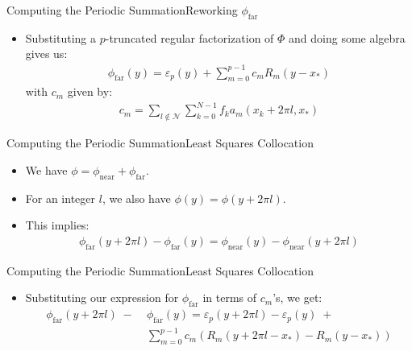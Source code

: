 \documentclass{beamer}
\newcommand{\parens}[1]{\left(#1\right)}
\newcommand{\phinear}{\phi_{\operatorname{near}}}
\newcommand{\phifar}{\phi_{\operatorname{far}}}
\begin{document}
\begin{frame}{Computing the Periodic Summation}{Reworking $\phifar$}
  \begin{itemize}
  \item Substituting a $p$-truncated regular factorization of $\Phi$
    and doing some algebra gives us:
    \begin{align*}
      \phifar(y) = \varepsilon_p(y) + \sum_{m=0}^{p-1} c_m R_m(y - x_*)
    \end{align*}
    with $c_m$ given by:
    \begin{align*}
      c_m = \sum_{l \notin \mathcal{N}} \sum_{k=0}^{N-1} f_k a_m(x_k + 2\pi l, x_*)
    \end{align*}
  \end{itemize}
\end{frame}

\begin{frame}{Computing the Periodic Summation}{Least Squares Collocation}
  \begin{itemize}
  \item We have $\phi = \phinear + \phifar$.
    \pause
  \item For an integer $l$, we also have $\phi(y) = \phi(y + 2\pi l)$.
    \pause
  \item This implies:
    \begin{align*}
      \phifar(y + 2\pi l) - \phifar(y) = \phinear(y) - \phinear(y + 2\pi l)
    \end{align*}
  \end{itemize}
\end{frame}

\begin{frame}{Computing the Periodic Summation}{Least Squares Collocation}
  \begin{itemize}
  \item Substituting our expression for $\phifar$
    in terms of $c_m$'s, we get:
    \begin{align*}
      \phifar(y + 2\pi l) \;-\; &\phifar(y) = \varepsilon_p(y + 2\pi l) - \varepsilon_p(y) \; + \\
      &\sum_{m=0}^{p-1} c_m \parens{R_m(y + 2\pi l - x_*) - R_m(y - x_*)}
    \end{align*}
  \end{itemize}
\end{frame}
\end{document}
